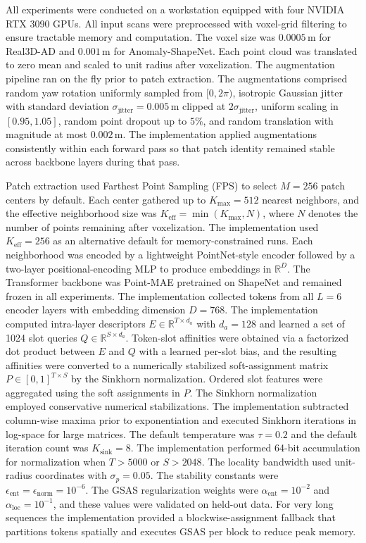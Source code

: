 All experiments were conducted on a workstation equipped with four NVIDIA RTX 3090 GPUs. All input scans were preprocessed with voxel-grid filtering to ensure tractable memory and computation. The voxel size was \(0.0005\,\mathrm{m}\) for Real3D-AD and \(0.001\,\mathrm{m}\) for Anomaly-ShapeNet. Each point cloud was translated to zero mean and scaled to unit radius after voxelization. The augmentation pipeline ran on the fly prior to patch extraction. The augmentations comprised random yaw rotation uniformly sampled from \([0,2\pi)\), isotropic Gaussian jitter with standard deviation \(\sigma_{\mathrm{jitter}}=0.005\,\mathrm{m}\) clipped at \(2\sigma_{\mathrm{jitter}}\), uniform scaling in \([0.95,1.05]\), random point dropout up to \(5\%\), and random translation with magnitude at most \(0.002\,\mathrm{m}\). The implementation applied augmentations consistently within each forward pass so that patch identity remained stable across backbone layers during that pass.

Patch extraction used Farthest Point Sampling (FPS) to select \(M=256\) patch centers by default. Each center gathered up to \(K_{\max}=512\) nearest neighbors, and the effective neighborhood size was \(K_{\mathrm{eff}}=\min(K_{\max},N)\), where \(N\) denotes the number of points remaining after voxelization. The implementation used \(K_{\mathrm{eff}}=256\) as an alternative default for memory-constrained runs. Each neighborhood was encoded by a lightweight PointNet-style encoder followed by a two-layer positional-encoding MLP to produce embeddings in \(\mathbb{R}^D\). The Transformer backbone was Point-MAE pretrained on ShapeNet and remained frozen in all experiments. The implementation collected tokens from all \(L=6\) encoder layers with embedding dimension \(D=768\). The implementation computed intra-layer descriptors \(E\in\mathbb{R}^{T\times d_a}\) with \(d_a=128\) and learned a set of 1024 slot queries \(Q\in\mathbb{R}^{S\times d_a}\). Token-slot affinities were obtained via a factorized dot product between \(E\) and \(Q\) with a learned per-slot bias, and the resulting affinities were converted to a numerically stabilized soft-assignment matrix \(P\in[0,1]^{T\times S}\) by the Sinkhorn normalization. Ordered slot features were aggregated using the soft assignments in \(P\). The Sinkhorn normalization employed conservative numerical stabilizations. The implementation subtracted column-wise maxima prior to exponentiation and executed Sinkhorn iterations in log-space for large matrices. The default temperature was \(\tau=0.2\) and the default iteration count was \(K_{\mathrm{sink}}=8\). The implementation performed 64-bit accumulation for normalization when \(T>5000\) or \(S>2048\). The locality bandwidth used unit-radius coordinates with \(\sigma_p=0.05\). The stability constants were \(\epsilon_{\mathrm{ent}}=\epsilon_{\mathrm{norm}}=10^{-6}\). The GSAS regularization weights were \(\alpha_{\mathrm{ent}}=10^{-2}\) and \(\alpha_{\mathrm{loc}}=10^{-1}\), and these values were validated on held-out data. For very long sequences the implementation provided a blockwise-assignment fallback that partitions tokens spatially and executes GSAS per block to reduce peak memory.

